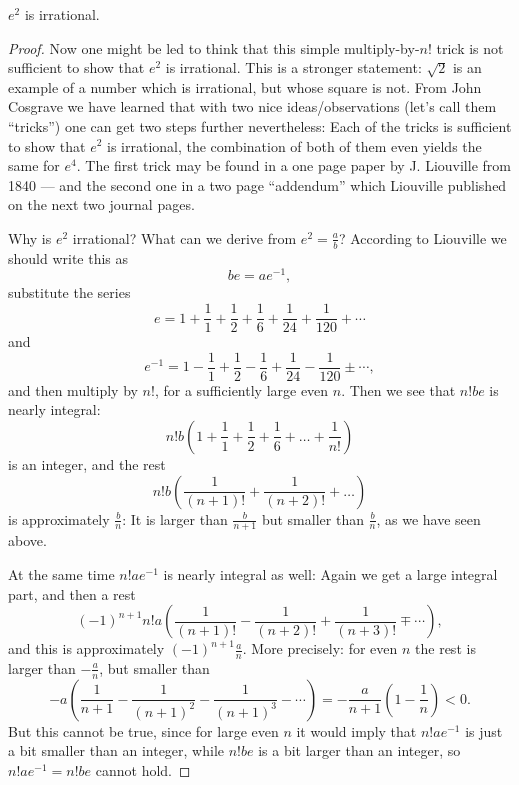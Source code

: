 \begin{theorem}
  \label{e_pow_2_irrational}
  \leanok
  $e^2$ is irrational.
\end{theorem}
\begin{proof}
  Now one might be led to think that this simple multiply-by-$n!$ trick is not sufficient to show that $e^2$ is irrational.
  This is a stronger statement:
  $\sqrt{2}$ is an example of a number which is irrational, but whose square is not.
  From John Cosgrave we have learned that with two nice ideas/observations (let's call them ``tricks'') one can get two steps further nevertheless:
  Each of the tricks is sufficient to show that $e^2$ is irrational, the combination of both of them even yields the same for $e^4$.
  The first trick may be found in a one page paper by J. Liouville from 1840 --- and the second one in a two page ``addendum''
  which Liouville published on the next two journal pages.

  Why is $e^2$ irrational?
  What can we derive from $e^2 = \frac{a}{b}$?
  According to Liouville we should write this as
  \[
  b e = a e^{-1},
  \]
  substitute the series
  \[
  e = 1 + \frac{1}{1} + \frac{1}{2} + \frac{1}{6} + \frac{1}{24} + \frac{1}{120} + \cdots
  \]
  and
  \[
  e^{-1} = 1 - \frac{1}{1} + \frac{1}{2} - \frac{1}{6} + \frac{1}{24} - \frac{1}{120} \pm \cdots,
  \]
  and then multiply by $n!$, for a sufficiently large even $n$.
  Then we see that $n! b e$ is nearly integral:
  \[
  n! b \left( 1 + \frac{1}{1} + \frac{1}{2} + \frac{1}{6} + \dots + \frac{1}{n!} \right)
  \]
  is an integer, and the rest
  \[
  n! b \left( \frac{1}{(n+1)!} + \frac{1}{(n+2)!} + \dots \right)
  \]
  is approximately $\frac{b}{n}$:
  It is larger than $\frac{b}{n+1}$ but smaller than $\frac{b}{n}$, as we have seen above.
  
  At the same time $n! a e^{-1}$ is nearly integral as well:
  Again we get a large integral part, and then a rest
  \[
  (-1)^{n+1} n! a \left( \frac{1}{(n+1)!} - \frac{1}{(n+2)!} + \frac{1}{(n+3)!} \mp \cdots \right),
  \]
  and this is approximately $(-1)^{n+1} \frac{a}{n}$.
  More precisely:
  for even $n$ the rest is larger than $-\frac{a}{n}$, but smaller than
  \[
  -a \left( \frac{1}{n+1} - \frac{1}{(n+1)^2} - \frac{1}{(n+1)^3} - \cdots \right) = - \frac{a}{n+1} \left( 1 - \frac{1}{n} \right) < 0.
  \]
  But this cannot be true, since for large even $n$ it would imply that $n! a e^{-1}$ is just a bit smaller than an integer, while $n! b e$ is a bit larger than an integer, so $n! a e^{-1} = n! b e$ cannot hold.
\end{proof}


